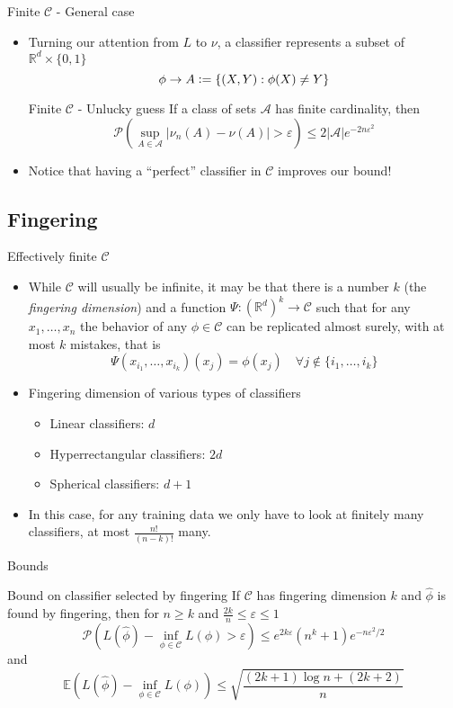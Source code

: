 \documentclass{beamer}
\renewcommand{\Pr}[1]{\mathcal{P} \left( #1 \right)}
\newcommand{\cls}{\mathcal{C}}
\newcommand{\E}[1]{\mathbb{E}\left( #1 \right)}
\newcommand{\R}{\mathbb{R}}
\newcommand{\defeq}{\vcentcolon=}
\newcommand{\abs}[1]{\left| #1 \right|}
\newcommand{\br}[1]{\left\{ #1 \right\} }
\newcommand{\eps}{\varepsilon}
\begin{document}
\begin{frame}{Finite $\cls$ - General case}
\begin{itemize}
\item Turning our attention from $L$ to $\nu$, a classifier represents a subset of $\R^d \times \{0,1\}$ 
\[ \phi \to A \defeq \br{ (X,Y) : \phi(X) \ne Y}\]
\begin{block}{Finite $\cls$ - Unlucky guess}
If a class of sets $\mathcal{A}$ has finite cardinality, then
\[ \Pr{ \sup_{A\in \mathcal{A}} \abs{\nu_n(A) - \nu(A)} > \eps} \leq 2\abs{\mathcal{A}} e^{-2n\eps^2} \]
\end{block}
\item Notice that having a ``perfect'' classifier in $\cls$ improves our bound!
\end{itemize}
\end{frame}

\subsection{Fingering}
\begin{frame}{Effectively finite $\cls$}
\begin{itemize}
\item While $\cls$ will usually be infinite, it may be that there is a number $k$ (the \emph{fingering dimension}) and a function $\Psi: (\R^d)^k \to \cls$ such that for any $x_1,\ldots,x_n$ the behavior of any $\phi \in \cls$ can be replicated almost surely, with at most $k$ mistakes, that is
\[ \Psi(x_{i_1}, \ldots, x_{i_k})(x_j) = \phi(x_j) \quad \forall j \not\in \{i_1,\ldots,i_k\} \]
\item Fingering dimension of various types of classifiers
\begin{itemize}
\item Linear classifiers: $d$
\item Hyperrectangular classifiers: $2d$
\item Spherical classifiers: $d+1$
\end{itemize}
\item In this case, for any training data we only have to look at finitely many classifiers, at most $\frac{n!}{(n-k)!}$ many.
\end{itemize}
\end{frame}

\begin{frame}{Bounds}
\begin{block}{Bound on classifier selected by fingering}
If $\cls$ has fingering dimension $k$ and $\hat\phi$ is found by fingering, then for $n \geq k$ and $\frac{2k}n \leq \eps \leq 1$
\[ \Pr{ L(\hat\phi) - \inf_{\phi \in \cls} L(\phi) > \eps} \leq e^{2k\eps}(n^k + 1)e^{-n\eps^2/2} \]
and
\[ \E{ L(\hat\phi) - \inf_{\phi \in \cls} L(\phi)} \leq \sqrt{\frac{(2k+1)\log n + (2k+2)}n}\]
\end{block}
\end{frame}
\end{document}
